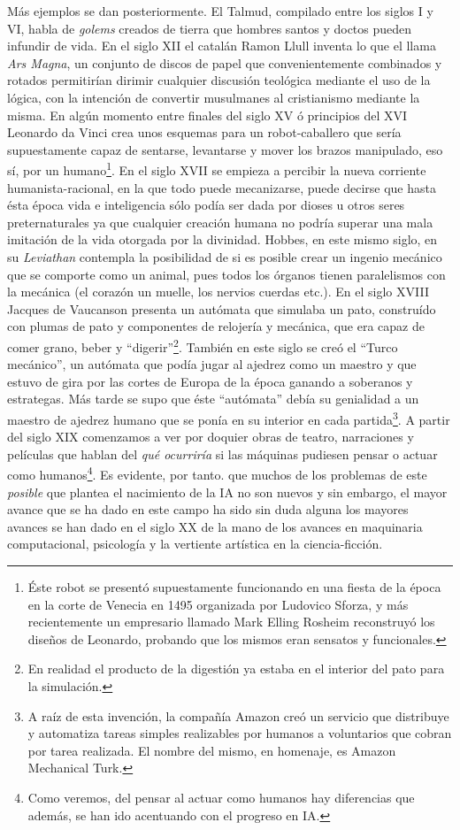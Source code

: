 \documentclass[12pt]{memoir}
\begin{document}
Más ejemplos se dan posteriormente. El Talmud, compilado entre los siglos I y VI, habla de \textit{golems} creados de tierra que hombres santos y doctos pueden infundir de vida. En el siglo XII el catalán Ramon Llull inventa lo que el llama \textit{Ars Magna}, un conjunto de discos de papel que convenientemente combinados y rotados permitirían dirimir cualquier discusión teológica mediante el uso de la lógica, con la intención de convertir musulmanes al cristianismo mediante la misma. En algún momento entre finales del siglo XV ó principios del XVI Leonardo da Vinci crea unos esquemas para un robot-caballero que sería supuestamente capaz de sentarse, levantarse y mover los brazos manipulado, eso sí, por un humano\footnote{Éste robot se presentó supuestamente funcionando en una fiesta de la época en la corte de Venecia en 1495 organizada por Ludovico Sforza, y más recientemente un empresario llamado Mark Elling Rosheim reconstruyó los diseños de Leonardo, probando que los mismos eran sensatos y funcionales.}. En el siglo XVII se empieza a percibir la nueva corriente humanista-racional, en la que todo puede mecanizarse, puede decirse que hasta ésta época vida e inteligencia sólo podía ser dada por dioses u otros seres preternaturales ya que cualquier creación humana no podría superar una mala imitación de la vida otorgada por la divinidad. Hobbes, en este mismo siglo, en su \textit{Leviathan} contempla la posibilidad de si es posible crear un ingenio mecánico que se comporte como un animal, pues todos los órganos tienen paralelismos con la mecánica (el corazón un muelle, los nervios cuerdas etc.). En el siglo XVIII Jacques de Vaucanson presenta un autómata que simulaba un pato, construído con plumas de pato y componentes de relojería y mecánica, que era capaz de comer grano, beber y ``digerir''\footnote{En realidad el producto de la digestión ya estaba en el interior del pato para la simulación.}. También en este siglo se creó el ``Turco mecánico'', un autómata que podía jugar al ajedrez como un maestro y que estuvo de gira por las cortes de Europa de la época ganando a soberanos y estrategas. Más tarde se supo que éste ``autómata'' debía su genialidad a un maestro de ajedrez humano que se ponía en su interior en cada partida\footnote{A raíz de esta invención, la compañía Amazon creó un servicio que distribuye y automatiza tareas simples realizables por humanos a voluntarios que cobran por tarea realizada. El nombre del mismo, en homenaje, es Amazon Mechanical Turk.}. A partir del siglo XIX comenzamos a ver por doquier obras de teatro, narraciones y películas que hablan del \textit{qué ocurriría} si las máquinas pudiesen pensar o actuar como humanos\footnote{Como veremos, del pensar al actuar como humanos hay diferencias que además, se han ido acentuando con el progreso en IA.}. Es evidente, por tanto. que muchos de los problemas de este \textit{posible} que plantea el nacimiento de la IA no son nuevos y sin embargo, el mayor avance que se ha dado en este campo ha sido sin duda alguna los mayores avances se han dado en el siglo XX de la mano de los avances en maquinaria computacional, psicología y la vertiente artística en la ciencia-ficción.
\end{document}
